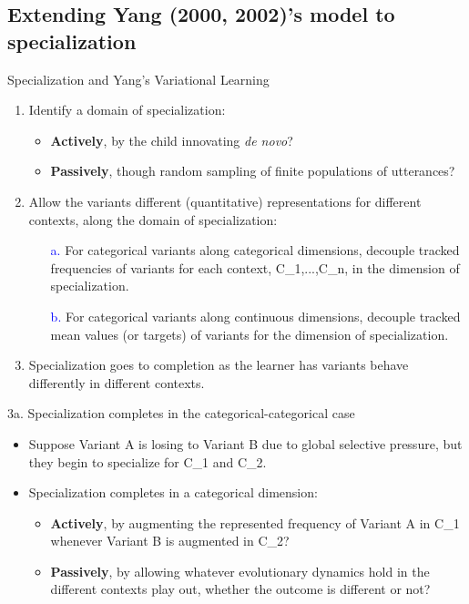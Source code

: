 \documentclass[hyperref={pdfpagelabels=false}]{beamer}
\begin{document}
\subsection{Extending Yang (2000, 2002)'s model to specialization}
\begin{frame}{Specialization and Yang's Variational Learning}
		\begin{enumerate}
			\item Identify a domain of specialization:
				\begin{itemize}
					\item \textbf{Actively}, by the child innovating \textsl{de novo}?
					\item \textbf{Passively}, though random sampling of finite populations of utterances?
				\end{itemize}
			\item Allow the variants different (quantitative) representations for different contexts, along the domain of specialization:
			\begin{itemize}
				\item[\textcolor{blue}{a.}] For categorical variants along categorical dimensions, decouple tracked frequencies of variants for each context, C_1,...,C_n, in the dimension of specialization.
				\item[\textcolor{blue}{b.}] For categorical variants along continuous dimensions, decouple tracked mean values (or targets) of variants for the dimension of specialization.
			\end{itemize}
			\item Specialization goes to completion as the learner has variants behave differently in different contexts.		\end{enumerate}
\end{frame}

\begin{frame}{3a. Specialization completes in the categorical-categorical case}
		\begin{itemize}
			\item Suppose Variant A is losing to Variant B due to global selective pressure, but they begin to specialize for C_1 and C_2.
			\item Specialization completes in a categorical dimension:
			\begin{itemize}
				\item \textbf{Actively}, by augmenting the represented frequency of Variant A in C_1 whenever Variant B is augmented in C_2?
				\item \textbf{Passively}, by allowing whatever evolutionary dynamics hold in the different contexts play out, whether the outcome is different or not?
			\end{itemize}
		\end{itemize}
\end{frame}
\end{document}
